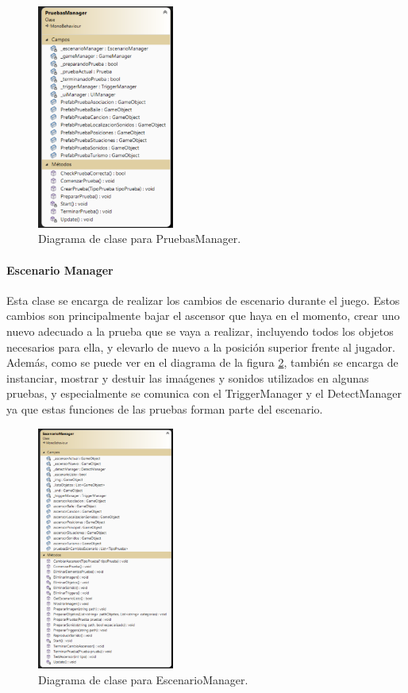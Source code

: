 \begin{figure}
	\centering
	\includegraphics[width=0.4\textwidth]{04.Desarrollo/05.Entrega5/01.Iteracion5_1/00.Figuras/14.diagrama_pruebas_manager.png}
	\caption{Diagrama de clase para PruebasManager.}
	\label{fig:diagramaPruebasManager}
\end{figure}



\paragraph{Escenario Manager}
Esta clase se encarga de realizar los cambios de escenario durante el juego. Estos cambios son principalmente bajar el ascensor que haya en el momento, crear uno nuevo adecuado a la prueba que se vaya a realizar, incluyendo todos los objetos necesarios para ella, y elevarlo de nuevo a la posición superior frente al jugador. Además, como se puede ver en el diagrama de la figura \ref{fig:diagramaEscenarioManager}, también se encarga de instanciar, mostrar y destuir las imaágenes y sonidos utilizados en algunas pruebas, y especialmente se comunica con el TriggerManager y el DetectManager ya que estas funciones de las pruebas forman parte del escenario.

\begin{figure}
	\centering
	\includegraphics[width=0.4\textwidth]{04.Desarrollo/05.Entrega5/01.Iteracion5_1/00.Figuras/15.diagrama_escenario.png}
	\caption{Diagrama de clase para EscenarioManager.}
	\label{fig:diagramaEscenarioManager}
\end{figure}


